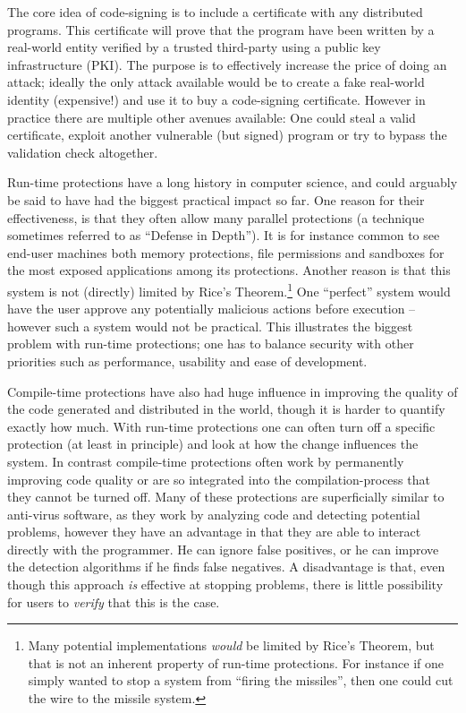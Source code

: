 The core idea of code-signing is to include a certificate with any distributed
programs. This certificate will prove that the program have been written by a
real-world entity verified by a trusted third-party using a public key
infrastructure (PKI). The purpose is to effectively increase the price of doing
an attack; ideally the only attack available would be to create a fake
real-world identity (expensive!) and use it to buy a code-signing
certificate. However in practice there are multiple other avenues available: One
could steal a valid certificate, exploit another vulnerable (but signed) program
or try to bypass the validation check altogether.

Run-time protections have a long history in computer science, and could arguably
be said to have had the biggest practical impact so far. One reason for their
effectiveness, is that they often allow many parallel protections (a technique
sometimes referred to as ``Defense in Depth''). It is for instance common to see
end-user machines both memory protections, file permissions and sandboxes for
the most exposed applications among its protections. Another reason is that this
system is not (directly) limited by Rice's Theorem.\footnote{Many potential
  implementations \emph{would} be limited by Rice's Theorem, but that is not an
  inherent property of run-time protections. For instance if one simply wanted
  to stop a system from ``firing the missiles'', then one could cut the wire to
  the missile system.} One ``perfect'' system would have the user approve any
potentially malicious actions before execution -- however such a system would
not be practical. This illustrates the biggest problem with run-time
protections; one has to balance security with other priorities such as
performance, usability and ease of development.

Compile-time protections have also had huge influence in improving the quality
of the code generated and distributed in the world, though it is harder to
quantify exactly how much. With run-time protections one can often turn off a
specific protection (at least in principle) and look at how the change
influences the system. In contrast compile-time protections often work by
permanently improving code quality or are so integrated into the
compilation-process that they cannot be turned off. Many of these protections
are superficially similar to anti-virus software, as they work by analyzing code
and detecting potential problems, however they have an advantage in that they
are able to interact directly with the programmer. He can ignore false
positives, or he can improve the detection algorithms if he finds false
negatives. A disadvantage is that, even though this approach \emph{is} effective
at stopping problems, there is little possibility for users to \emph{verify}
that this is the case.

